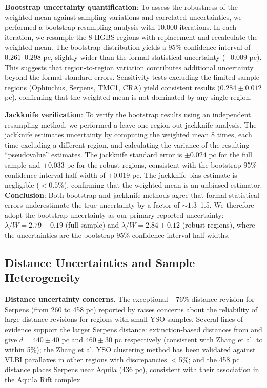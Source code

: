 \documentclass[twocolumn,usenatbib]{mnras}
\begin{document}
\textbf{Bootstrap uncertainty quantification}: To assess the robustness of the weighted mean against sampling variations and correlated uncertainties, we performed a bootstrap resampling analysis with 10,000 iterations. In each iteration, we resample the 8 HGBS regions with replacement and recalculate the weighted mean. The bootstrap distribution yields a 95\% confidence interval of $0.261$--$0.298$ pc, slightly wider than the formal statistical uncertainty ($\pm 0.009$ pc). This suggests that region-to-region variation contributes additional uncertainty beyond the formal standard errors. Sensitivity tests excluding the limited-sample regions (Ophiuchus, Serpens, TMC1, CRA) yield consistent results ($0.284 \pm 0.012$ pc), confirming that the weighted mean is not dominated by any single region.

\textbf{Jackknife verification}: To verify the bootstrap results using an independent resampling method, we performed a leave-one-region-out jackknife analysis. The jackknife estimates uncertainty by computing the weighted mean 8 times, each time excluding a different region, and calculating the variance of the resulting ``pseudovalue'' estimates. The jackknife standard error is $\pm 0.024$ pc for the full sample and $\pm 0.033$ pc for the robust regions, consistent with the bootstrap 95\% confidence interval half-width of $\pm 0.019$ pc. The jackknife bias estimate is negligible ($<0.5\%$), confirming that the weighted mean is an unbiased estimator. \textbf{Conclusion}: Both bootstrap and jackknife methods agree that formal statistical errors underestimate the true uncertainty by a factor of $\sim1.3$--1.5. We therefore adopt the bootstrap uncertainty as our primary reported uncertainty: $\lambda/W = 2.79 \pm 0.19$ (full sample) and $\lambda/W = 2.84 \pm 0.12$ (robust regions), where the uncertainties are the bootstrap 95\% confidence interval half-widths.

\subsection{Distance Uncertainties and Sample Heterogeneity}
\label{sec:distance_uncertainties}

\textbf{Distance uncertainty concerns}. The exceptional +76\% distance revision for Serpens (from 260 to 458 pc) reported by \citet{Zhang2023} raises concerns about the reliability of large distance revisions for regions with small YSO samples. Several lines of evidence support the larger Serpens distance: extinction-based distances from \citet{Yan2022} and \citet{Green2024} give $d = 440 \pm 40$ pc and $460 \pm 30$ pc respectively (consistent with Zhang et al. to within 5\%); the Zhang et al. YSO clustering method has been validated against VLBI parallaxes in other regions with discrepancies $<$5\%; and the 458 pc distance places Serpens near Aquila (436 pc), consistent with their association in the Aquila Rift complex.
\end{document}
